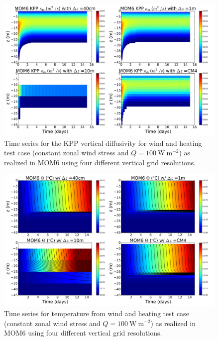 \begin{figure}[h!t]
\begin{center}
\includegraphics[angle=0,width=14cm]{./figs/MOM6/skin_warming_wind_KPP_MOM6_KPP_diffusivity.png}
\caption[KPP diffusivity from MOM6 for wind and heating test]{\sf Time
  series for the KPP vertical diffusivity for wind and heating test
  case (constant zonal wind stress and $Q=100~\mbox{W}~\mbox{m}^{-2}$)
  as realized in MOM6 using four different vertical grid resolutions.}
\label{fig:MOM6_KPP_diffusivity-wind_and_heating}
\end{center}
\end{figure}


\begin{figure}[h!t]
\begin{center}
\includegraphics[angle=0,width=14cm]{./figs/MOM6/skin_warming_wind_KPP_MOM6_temp.png}
\caption[Temperature from MOM6 for wind and heating test]{\sf Time
  series for temperature from wind and heating test case (constant
  zonal wind stress and $Q=100~\mbox{W}~\mbox{m}^{-2}$) as realized in
  MOM6 using four different vertical grid resolutions.}
\label{fig:MOM6_temp-wind_and_heating}
\end{center}
\end{figure}

